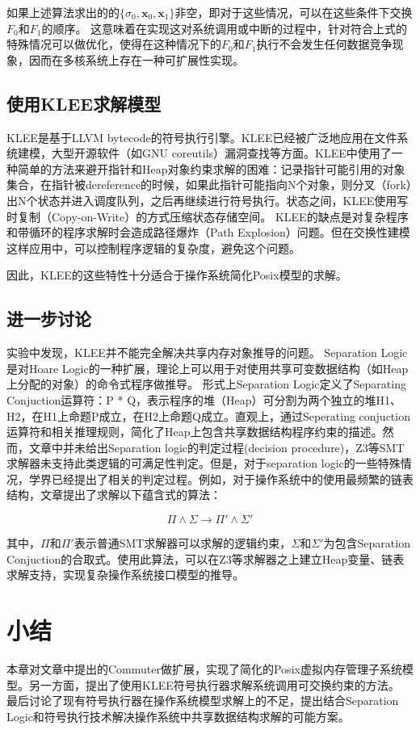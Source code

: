 如果上述算法求出的的$\{\sigma_0,\boldsymbol{x}_0,
\boldsymbol{x}_1\}$非空，即对于这些情况，可以在这些条件下交换$F_0$和$F_1$的顺序。
这意味着在实现这对系统调用或中断的过程中，针对符合上式的特殊情况可以做优化，使得在这种情况下的$F_0$和$F_1$执行不会发生任何数据竞争现象，因而在多核系统上存在一种可扩展性实现。



\subsection{使用KLEE求解模型}
KLEE是基于LLVM
bytecode的符号执行引擎。KLEE已经被广泛地应用在文件系统建模，大型开源软件（如GNU
coreutils）漏洞查找\cite{Cadar:2008:KUA:1855741.1855756}等方面。KLEE中使用了一种简单的方法来避开指针和Heap对象约束求解的困难：记录指针可能引用的对象集合，在指针被dereference的时候，如果此指针可能指向N个对象，则分叉（fork）出N个状态并进入调度队列，之后再继续进行符号执行。状态之间，KLEE使用写时复制（Copy-on-Write）的方式压缩状态存储空间。
KLEE的缺点是对复杂程序和带循环的程序求解时会造成路径爆炸（Path
Explosion）问题。但在交换性建模这样应用中，可以控制程序逻辑的复杂度，避免这个问题。

因此，KLEE的这些特性十分适合于操作系统简化Posix模型的求解。


\subsection{进一步讨论}

实验中发现，KLEE并不能完全解决共享内存对象推导的问题。
Separation Logic是对Hoare
Logic的一种扩展，理论上可以用于对使用共享可变数据结构（如Heap上分配的对象）的命令式程序做推导\cite{Reynolds:2002:SLL:645683.664578}。
形式上Separation Logic定义了Separating Conjuction运算符：P *
Q，表示程序的堆（Heap）可分割为两个独立的堆H1、H2，在H1上命题P成立，在H2上命题Q成立。直观上，通过Seperating
conjuction运算符和相关推理规则，简化了Heap上包含共享数据结构程序约束的描述。然而，文章\cite{Reynolds:2002:SLL:645683.664578}中并未给出Separation
logic的判定过程(decision
procedure)，Z3等SMT求解器未支持此类逻辑的可满足性判定。但是，对于separation
logic的一些特殊情况，学界已经提出了相关的判定过程。例如，对于操作系统中的使用最频繁的链表结构，文章\cite{seplogic:theorem}提出了求解以下蕴含式的算法：

\begin{equation}
	\Pi \land \Sigma \to \Pi' \land \Sigma'
\end{equation}

其中，$\Pi$和$\Pi'$表示普通SMT求解器可以求解的逻辑约束，$\Sigma$和$\Sigma'$为包含Separation
Conjuction的合取式。使用此算法，可以在Z3等求解器之上建立Heap变量、链表求解支持，实现复杂操作系统接口模型的推导。

\section{小结}
本章对文章\cite{commuter:2013}中提出的Commuter做扩展，实现了简化的Posix虚拟内存管理子系统模型。另一方面，提出了使用KLEE符号执行器求解系统调用可交换约束的方法。
最后讨论了现有符号执行器在操作系统模型求解上的不足，提出结合Separation
Logic和符号执行技术解决操作系统中共享数据结构求解的可能方案。
